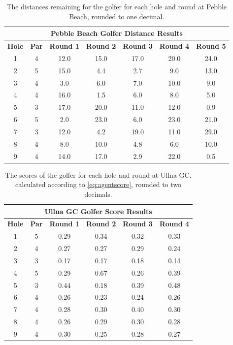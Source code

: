 \documentclass{kththesis}
\begin{document}
\begin{table}
    \centering
    \begin{tabular}{|c|c|c|c|c|c|c|} \hline
    \multicolumn{7}{|c|}{\textbf{Pebble Beach Golfer Distance Results}} \\ \hline  
    \textbf{Hole} & \textbf{Par} & \textbf{Round 1} & \textbf{Round 2} & \textbf{Round 3} & \textbf{Round 4} & \textbf{Round 5} \\ \hline
    1 & 4 & 12.0 & 15.0 & 17.0 & 20.0 & 24.0 \\ \hline
    2 & 5 & 15.0 & 4.4 & 2.7 & 9.0 & 13.0 \\ \hline
    3 & 4 & 3.0 & 6.0 & 7.0 & 10.0 & 9.0 \\ \hline
    4 & 4 & 16.0 & 1.5 & 6.0 & 8.0 & 5.0 \\ \hline
    5 & 3 & 17.0 & 20.0 & 11.0 & 12.0 & 0.9 \\ \hline
    6 & 5 & 2.0 & 23.0 & 6.0 & 23.0 & 21.0 \\ \hline
    7 & 3 & 12.0 & 4.2 & 19.0 & 11.0 & 29.0 \\ \hline
    8 & 4 & 8.0 & 10.0 & 4.8 & 6.0 & 10.0 \\ \hline
    9 & 4 & 14.0 & 17.0 & 2.9 & 22.0 & 0.5 \\ \hline
    \end{tabular}
    \caption{The distances remaining for the golfer for each hole and round at Pebble Beach, rounded to one decimal.}
    \label{tab:L2_pebble_distance_results}
\end{table}

\begin{table}
    \centering
    \begin{tabular}{|c|c|c|c|c|c|} \hline
    \multicolumn{6}{|c|}{\textbf{Ullna GC Golfer Score Results}} \\ \hline  
    \textbf{Hole} & \textbf{Par} & \textbf{Round 1} & \textbf{Round 2} & \textbf{Round 3} & \textbf{Round 4} \\ \hline
    1 & 5 & 0.29 & 0.34 & 0.32 & 0.33 \\ \hline
    2 & 4 & 0.27 & 0.27 & 0.29 & 0.24 \\ \hline
    3 & 3 & 0.17 & 0.17 & 0.18 & 0.14 \\ \hline
    4 & 5 & 0.29 & 0.67 & 0.26 & 0.39 \\ \hline
    5 & 3 & 0.44 & 0.18 & 0.39 & 0.48 \\ \hline
    6 & 4 & 0.26 & 0.23 & 0.24 & 0.26 \\ \hline
    7 & 4 & 0.28 & 0.30 & 0.40 & 0.30 \\ \hline
    8 & 4 & 0.26 & 0.29 & 0.30 & 0.28 \\ \hline
    9 & 4 & 0.30 & 0.25 & 0.28 & 0.27 \\ \hline
    \end{tabular}
    \caption{The scores of the golfer for each hole and round at Ullna GC, calculated according to \autoref{eq:agentscore}, rounded to two decimals.}
    \label{tab:L2_ullna_score_results}
\end{table}
\end{document}
